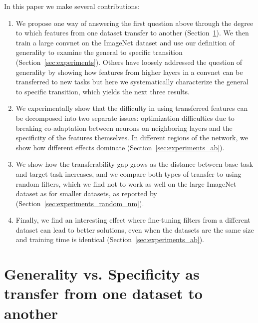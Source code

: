 In this paper we make several contributions:

\begin{enumerate}
\item We propose one way of answering the first question above through the degree to which features from one dataset transfer to another (Section~\ref{sec:definition}). We then train a large convnet on the ImageNet dataset and use our definition of generality to examine the general to specific transition (Section~\ref{sec:experiments}).
Others have loosely addressed the question of generality by showing how features from higher layers in a convnet can be transferred to new tasks \cite{donahue+jia-2013-arxiv} but here we systematically characterize the general to specific transition, which yields the next three results.
\item We experimentally show that the difficulty in using transferred features can be decomposed into two separate issues: optimization difficulties due to breaking co-adaptation between neurons on neighboring layers and the specificity of the features themselves. In different regions of the network, we show how different effects dominate (Section~\ref{sec:experiments_ab}).
\item We show how the transferability gap grows as the distance between base
task and target task increases, and we compare both types of transfer to using random filters, which we find not to work as well on the large ImageNet dataset as for smaller datasets, as reported by \cite{Jarrett-ICCV2009} (Section~\ref{sec:experiments_random_nm}).
\item Finally, we find an interesting effect where fine-tuning filters from a different dataset can lead to better solutions, even when the datasets are the same size and training time is identical (Section~\ref{sec:experiments_ab}).
\end{enumerate}






\section{Generality vs. Specificity as transfer from one dataset to another}
\label{sec:definition}

